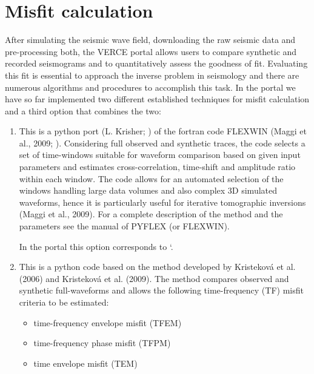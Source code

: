 \documentclass[english]{book}
\begin{document}
\section{Misfit calculation}
\label{\detokenize{Section7:misfit-calculation}}
After simulating the seismic wave field, downloading the raw seismic
data and pre-processing both, the VERCE portal allows users to compare
synthetic and recorded seismograms and to quantitatively assess the
goodness of fit. Evaluating this fit is essential to approach the
inverse problem in seismology and there are numerous algorithms and
procedures to accomplish this task. In the portal we have so far
implemented two different established techniques for misfit calculation
and a third option that combines the two:
\begin{enumerate}
\item {} 

This is a python port (L. Krisher; ) of
the fortran code FLEXWIN (Maggi et al., 2009;
). Considering full observed
and synthetic traces, the code selects a set of time-windows suitable
for waveform comparison based on given input parameters and estimates
cross-correlation, time-shift and amplitude ratio within each window.
The code allows for an automated selection of the windows handling large
data volumes and also complex 3D simulated waveforms, hence it is
particularly useful for iterative tomographic inversions (Maggi et al.,
2009). For a complete description of the method and the parameters see
the manual of PYFLEX (or FLEXWIN).

In the portal this option corresponds to ‘.

\item {} 

This is a python code based on the method developed by Kristeková et al.
(2006) and Kristeková et al. (2009). The method compares observed and
synthetic full-waveforms and allows the following time-frequency (TF)
misfit criteria to be estimated:
\begin{itemize}
\item {} 
time-frequency envelope misfit (TFEM)

\item {} 
time-frequency phase misfit (TFPM)

\item {} 
time envelope misfit (TEM)


\end{itemize}
\end{enumerate}
\end{document}
